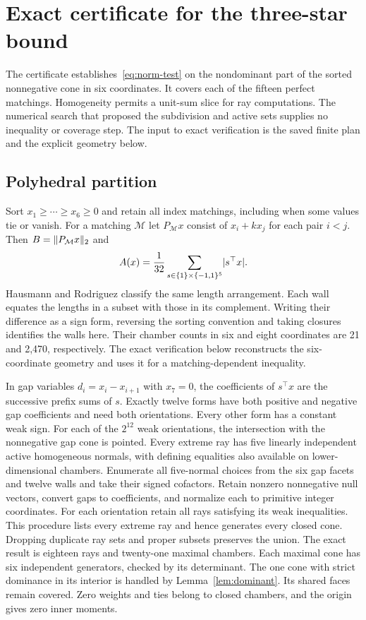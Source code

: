 \section{Exact certificate for the three-star bound}\label{app:tape}

The certificate establishes~\eqref{eq:norm-test} on the
nondominant part of the sorted nonnegative cone in six coordinates.
It covers each of the fifteen perfect matchings. Homogeneity permits a
unit-sum slice for ray computations. The numerical search that proposed
the subdivision and active sets supplies no inequality or coverage step.
The input to exact verification is the saved finite plan and the explicit
geometry below.

\subsection{Polyhedral partition}

Sort $x_1\ge\cdots\ge x_6\ge0$ and retain all index matchings,
including when some values tie or vanish. For a matching
$\mathcal M$ let $P_\mathcal M x$ consist of $x_i+kx_j$ for each
pair $i<j$. Then $B=\lVert P_\mathcal M x\rVert_2$ and
\[
 A(x)=\frac1{32}\sum_{s\in\{1\}\times\{-1,1\}^5}\lvert s^\top x\rvert.
\]
Hausmann and Rodriguez \cite[Table (1--1), Sections 4--5]{hausmann}
classify the same length arrangement. Each wall equates the lengths
in a subset with those in its complement. Writing their difference
as a sign form, reversing the sorting convention and taking closures
identifies the walls here. Their chamber counts in six and eight
coordinates are 21 and 2,470, respectively. The exact verification
below reconstructs the six-coordinate geometry and uses it for a
matching-dependent inequality.

In gap variables $d_i=x_i-x_{i+1}$ with $x_7=0$, the coefficients of
$s^\top x$ are the successive prefix sums of $s$. Exactly twelve
forms have both positive and negative gap coefficients and need
both orientations. Every other form has a constant weak sign.
For each of the $2^{12}$ weak orientations, the intersection with
the nonnegative gap cone is pointed. Every extreme ray has five
linearly independent active homogeneous normals, with defining
equalities also available on lower-dimensional chambers.
Enumerate all five-normal choices from the six gap facets and
twelve walls and take their signed cofactors. Retain nonzero
nonnegative null vectors, convert gaps to coefficients, and normalize
each to primitive integer coordinates. For each orientation retain
all rays satisfying its weak inequalities. This procedure lists
every extreme ray and hence generates every closed cone.
Dropping duplicate ray sets and proper subsets preserves the union.
The exact result is eighteen rays and twenty-one maximal chambers.
Each maximal cone has six independent generators, checked by its
determinant. The one cone with strict dominance in its interior is
handled by Lemma~\ref{lem:dominant}. Its shared faces remain covered.
Zero weights and ties belong to closed chambers, and the origin
gives zero inner moments.

